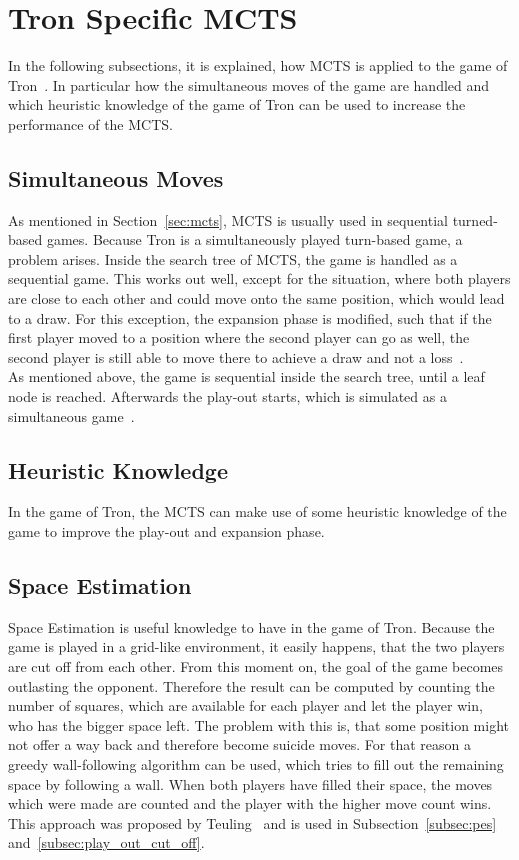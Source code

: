 \documentclass{article}
\begin{document}
\section{Tron Specific MCTS}
\label{sec:tron_specific_mcts}
In the following subsections, it is explained, how MCTS is applied to the game of Tron~\cite{teuling_tron}. In particular how the simultaneous moves of the game are handled and which heuristic knowledge of the game of Tron can be used to increase the performance of the MCTS.

\subsection{Simultaneous Moves}
\label{subsec:sim_moves}
As mentioned in Section~\ref{sec:mcts}, MCTS is usually used in sequential turned-based games. Because Tron is a simultaneously played turn-based game, a problem arises. Inside the search tree of MCTS, the game is handled as a sequential game. This works out well, except for the situation, where both players are close to each other and could move onto the same position, which would lead to a draw. For this exception, the expansion phase is modified, such that if the first player moved to a position where the second player can go as well, the second player is still able to move there to achieve a draw and not a loss~\cite{teuling_tron}.\\
As mentioned above, the game is sequential inside the search tree, until a leaf node is reached. Afterwards the play-out starts, which is simulated as a simultaneous game~\cite{teuling_tron}.

\subsection{Heuristic Knowledge}
\label{subsec:heuristic_knowledge}
In the game of Tron, the MCTS can make use of some heuristic knowledge of the game to improve the play-out and expansion phase. 

\subsection*{Space Estimation}

Space Estimation is useful knowledge to have in the game of Tron. Because the game is played in a grid-like environment, it easily happens, that the two players are cut off from each other. From this moment on, the goal of the game becomes outlasting the opponent. Therefore the result can be  computed by counting the number of squares, which are available for each player and let the player win, who has the bigger space left. The problem with this is, that some position might not offer a way back and therefore become suicide moves. For that reason a greedy wall-following algorithm can be used, which tries to fill out the remaining space by following a wall. When both players have filled their space, the moves which were made are counted and the player with the higher move count wins. This approach was proposed by Teuling~\cite{teuling_tron} and is used in Subsection~\ref{subsec:pes} and~\ref{subsec:play_out_cut_off}.
\end{document}
